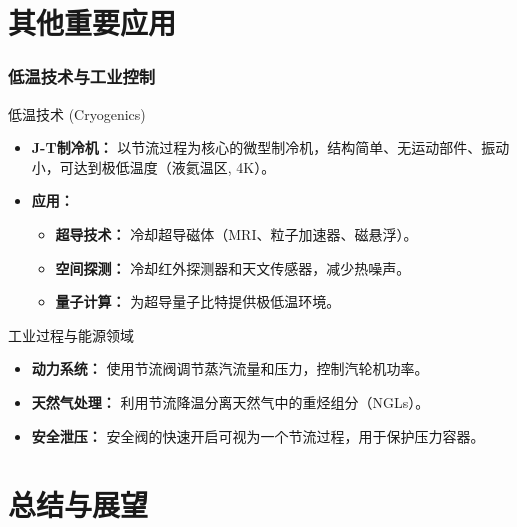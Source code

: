 \documentclass{beamer}
\begin{document}
\section{其他重要应用}

\begin{frame}
  \frametitle{低温技术与工业控制}
  \begin{block}{低温技术 (Cryogenics)}
    \begin{itemize}
        \item \textbf{J-T制冷机：} 以节流过程为核心的微型制冷机，结构简单、无运动部件、振动小，可达到极低温度（液氦温区, 4K）。
        \item \textbf{应用：}
        \begin{itemize}
            \item \textbf{超导技术：} 冷却超导磁体（MRI、粒子加速器、磁悬浮）。
            \item \textbf{空间探测：} 冷却红外探测器和天文传感器，减少热噪声。
            \item \textbf{量子计算：} 为超导量子比特提供极低温环境。
        \end{itemize}
    \end{itemize}
  \end{block}
  \vfill
  \begin{block}{工业过程与能源领域}
    \begin{itemize}
        \item \textbf{动力系统：} 使用节流阀调节蒸汽流量和压力，控制汽轮机功率。
        \item \textbf{天然气处理：} 利用节流降温分离天然气中的重烃组分（NGLs）。
        \item \textbf{安全泄压：} 安全阀的快速开启可视为一个节流过程，用于保护压力容器。
    \end{itemize}
  \end{block}
\end{frame}


\section{总结与展望}
\end{document}
